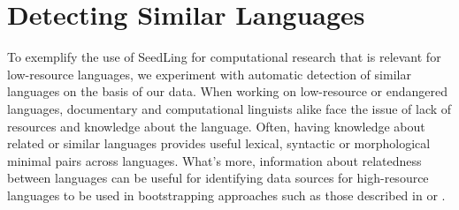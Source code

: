 






\section{Detecting Similar Languages} 

To exemplify the use of SeedLing for computational research that is relevant for low-resource languages, we experiment  with automatic detection of similar languages on the basis of our data. 
\label{sec:cluster} When working on low-resource or endangered 
languages, documentary and computational linguists alike face the
issue of lack of resources and knowledge about the language. Often,
having knowledge about related or similar languages provides useful
lexical, syntactic or morphological minimal pairs across
languages. What's more, information about relatedness between
languages can be useful for identifying data sources for high-resource
languages to be used in bootstrapping approaches such as those
described in  or
.

